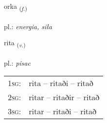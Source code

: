 \documentclass[frontgrid, backgrid]{flacards}\usepackage[]{graphicx}\usepackage[]{xcolor}
\begin{document}
\renewcommand{\flhead}{\vskip5pt \fboxsep=0pt {\small\bfseries\footnotesize Nafnorð | Noun}}
\renewcommand{\fcfoot}{\vskip5pt \fboxsep=0pt \hspace{2pt}{\small\bfseries\footnotesize 2K}}

\renewcommand{\blhead}{\vskip5pt {\small\bfseries\footnotesize Nafnorð | Noun }}
\renewcommand{\bcfoot}{\vskip5pt \hspace{2pt}{\small\bfseries\footnotesize 2K}}


{orka \small{\textsubscript{(\textit{f.})}} \\[1ex] %
\textphonetic{[ɔr̥ka]} \\
pl.: \emph{energia, siła} \\  [2ex]
\renewcommand*{\arraystretch}{0.8}
}

\renewcommand{\flhead}{\vskip5pt \fboxsep=0pt {\small\bfseries\footnotesize Sagnorð | Verb}}
\renewcommand{\fcfoot}{\vskip5pt \fboxsep=0pt \hspace{2pt}{\small\bfseries\footnotesize 2K}}

\renewcommand{\blhead}{\vskip5pt {\small\bfseries\footnotesize Sagnorð | Verb }}
\renewcommand{\bcfoot}{\vskip5pt \hspace{2pt}{\small\bfseries\footnotesize 2K}}


{rita \small{\textsubscript{(\textit{v.})}} \\[1ex] %
\textphonetic{[rɪːta]} \\
pl.: \emph{pisac} \\  [2ex]
\renewcommand*{\arraystretch}{0.8}
\begin{tabular}{p{1cm}l}
\textsc{1sg}: & rita -- ritaði -- ritað \\ 
\textsc{2sg}: & ritar -- ritaðir -- ritað \\ 
\textsc{3sg}: & ritar -- ritaði -- ritað \\ 
\end{tabular}
}
\end{document}
